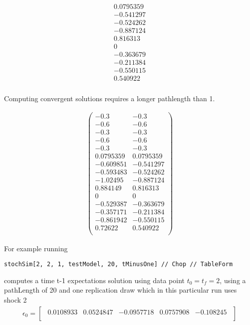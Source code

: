 {\small
\begin{gather*}\begin{array}{c}
 0.0795359 \\
 -0.541297 \\
 -0.524262 \\
 -0.887124 \\
 0.816313 \\
 0 \\
 -0.363679 \\
 -0.211384 \\
 -0.550115 \\
 0.540922 \\
\end{array}
\end{gather*}
}

Computing convergent solutions requires a longer pathlength than 1.

{\small
\begin{gather*}\left(
\begin{array}{cc}
 -0.3 & -0.3 \\
 -0.6 & -0.6 \\
 -0.3 & -0.3 \\
 -0.6 & -0.6 \\
 -0.3 & -0.3 \\
 0.0795359 & 0.0795359 \\
 -0.609851 & -0.541297 \\
 -0.593483 & -0.524262 \\
 -1.02495 & -0.887124 \\
 0.884149 & 0.816313 \\
 0 & 0 \\
 -0.529387 & -0.363679 \\
 -0.357171 & -0.211384 \\
 -0.861942 & -0.550115 \\
 0.72622 & 0.540922 \\
\end{array}
\right)
\end{gather*}
}






For example running 


\begin{verbatim}
stochSim[2, 2, 1, testModel, 20, tMinusOne] // Chop // TableForm
\end{verbatim}
computes a time t-1 expectations solution using data point $t_0=t_f=2$, using a pathLength of 20 and one replication draw 
which in this particular run uses
shock {2}
\begin{gather*}\epsilon_0=
  \begin{bmatrix}\begin{array}{ccccc}
 0.0108933 & 0.0524847 & -0.0957718 & 0.0757908 & -0.108245 \\
\end{array}
  \end{bmatrix}
\end{gather*}


